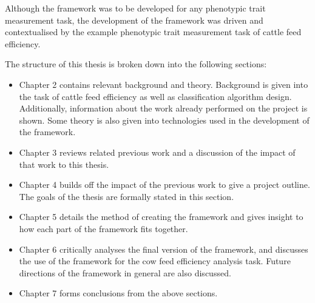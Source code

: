 Although the framework was to be developed for any phenotypic trait measurement task, the development of the framework was driven and contextualised by the example phenotypic trait measurement task of cattle feed efficiency.

The structure of this thesis is broken down into the following sections:

\begin{itemize}

\item Chapter 2 contains relevant background and theory. Background is given into the task of cattle feed efficiency as well as classification algorithm design. Additionally, information about the work already performed on the project is shown. Some theory is also given into technologies used in the development of the framework. 

\item Chapter 3 reviews related previous work and a discussion of the impact of that work to this thesis.

\item Chapter 4 builds off the impact of the previous work to give a project outline. The goals of the thesis are formally stated in this section.

\item Chapter 5 details the method of creating the framework and gives insight to how each part of the framework fits together. 

\item Chapter 6 critically analyses the final version of the framework, and discusses the use of the framework for the cow feed efficiency analysis task. Future directions of the framework in general are also discussed.

\item Chapter 7 forms conclusions from the above sections.

\end{itemize}

